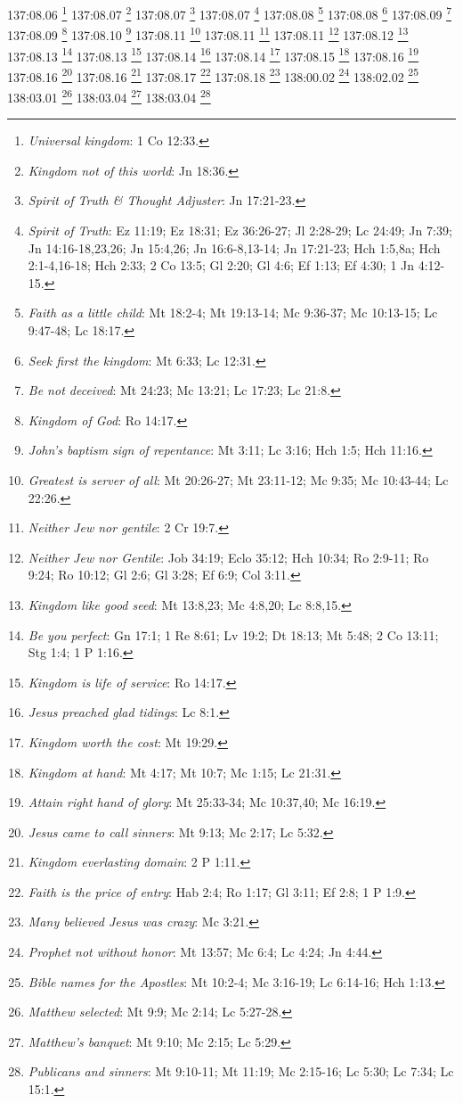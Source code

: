 {{{{{{{137:08.06 \footnote{\textit{Universal kingdom}: 1 Co 12:33.}
137:08.07 \footnote{\textit{Kingdom not of this world}: Jn 18:36.}
137:08.07 \footnote{\textit{Spirit of Truth & Thought Adjuster}: Jn 17:21-23.}
137:08.07 \footnote{\textit{Spirit of Truth}: Ez 11:19; Ez 18:31; Ez 36:26-27; Jl 2:28-29; Lc 24:49; Jn 7:39; Jn 14:16-18,23,26; Jn 15:4,26; Jn 16:6-8,13-14; Jn 17:21-23; Hch 1:5,8a; Hch 2:1-4,16-18; Hch 2:33; 2 Co 13:5; Gl 2:20; Gl 4:6; Ef 1:13; Ef 4:30; 1 Jn 4:12-15.}
137:08.08 \footnote{\textit{Faith as a little child}: Mt 18:2-4; Mt 19:13-14; Mc 9:36-37; Mc 10:13-15; Lc 9:47-48; Lc 18:17.}
137:08.08 \footnote{\textit{Seek first the kingdom}: Mt 6:33; Lc 12:31.}
137:08.09 \footnote{\textit{Be not deceived}: Mt 24:23; Mc 13:21; Lc 17:23; Lc 21:8.}
137:08.09 \footnote{\textit{Kingdom of God}: Ro 14:17.}
137:08.10 \footnote{\textit{John's baptism sign of repentance}: Mt 3:11; Lc 3:16; Hch 1:5; Hch 11:16.}
137:08.11 \footnote{\textit{Greatest is server of all}: Mt 20:26-27; Mt 23:11-12; Mc 9:35; Mc 10:43-44; Lc 22:26.}
137:08.11 \footnote{\textit{Neither Jew nor gentile}: 2 Cr 19:7.}
137:08.11 \footnote{\textit{Neither Jew nor Gentile}: Job 34:19; Eclo 35:12; Hch 10:34; Ro 2:9-11; Ro 9:24; Ro 10:12; Gl 2:6; Gl 3:28; Ef 6:9; Col 3:11.}
137:08.12 \footnote{\textit{Kingdom like good seed}: Mt 13:8,23; Mc 4:8,20; Lc 8:8,15.}
137:08.13 \footnote{\textit{Be you perfect}: Gn 17:1; 1 Re 8:61; Lv 19:2; Dt 18:13; Mt 5:48; 2 Co 13:11; Stg 1:4; 1 P 1:16.}
137:08.13 \footnote{\textit{Kingdom is life of service}: Ro 14:17.}
137:08.14 \footnote{\textit{Jesus preached glad tidings}: Lc 8:1.}
137:08.14 \footnote{\textit{Kingdom worth the cost}: Mt 19:29.}
137:08.15 \footnote{\textit{Kingdom at hand}: Mt 4:17; Mt 10:7; Mc 1:15; Lc 21:31.}
137:08.16 \footnote{\textit{Attain right hand of glory}: Mt 25:33-34; Mc 10:37,40; Mc 16:19.}
137:08.16 \footnote{\textit{Jesus came to call sinners}: Mt 9:13; Mc 2:17; Lc 5:32.}
137:08.16 \footnote{\textit{Kingdom everlasting domain}: 2 P 1:11.}
137:08.17 \footnote{\textit{Faith is the price of entry}: Hab 2:4; Ro 1:17; Gl 3:11; Ef 2:8; 1 P 1:9.}
137:08.18 \footnote{\textit{Many believed Jesus was crazy}: Mc 3:21.}
138:00.02 \footnote{\textit{Prophet not without honor}: Mt 13:57; Mc 6:4; Lc 4:24; Jn 4:44.}
138:02.02 \footnote{\textit{Bible names for the Apostles}: Mt 10:2-4; Mc 3:16-19; Lc 6:14-16; Hch 1:13.}
138:03.01 \footnote{\textit{Matthew selected}: Mt 9:9; Mc 2:14; Lc 5:27-28.}
138:03.04 \footnote{\textit{Matthew's banquet}: Mt 9:10; Mc 2:15; Lc 5:29.}
138:03.04 \footnote{\textit{Publicans and sinners}: Mt 9:10-11; Mt 11:19; Mc 2:15-16; Lc 5:30; Lc 7:34; Lc 15:1.}
}}}}}}}
